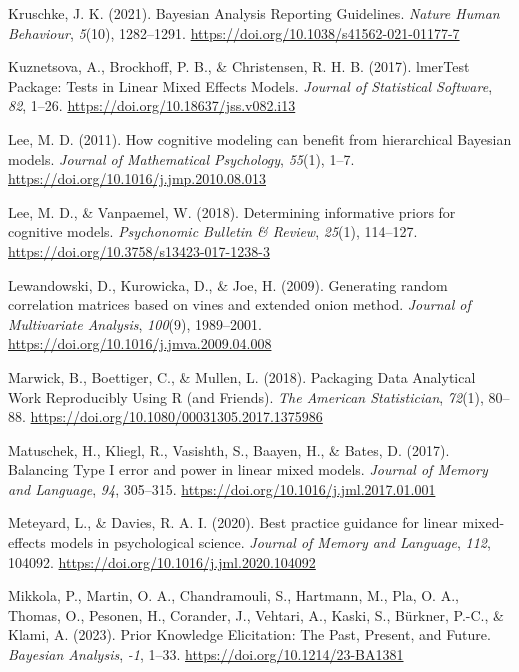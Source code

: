 \documentclass[
  doc,12pt,floatsintext]{apa7}
\newlength{\cslhangindent}
\newenvironment{CSLReferences}[2] %
 {\begin{list}{}{%
  \setlength{\itemindent}{0pt}
  \setlength{\leftmargin}{0pt}
  \setlength{\parsep}{0pt}
  \ifodd #1
   \setlength{\leftmargin}{\cslhangindent}
   \setlength{\itemindent}{-1\cslhangindent}
  \fi
  \setlength{\itemsep}{#2\baselineskip}}}
 {\end{list}}
\begin{document}
\begin{CSLReferences}{1}{0}
Kruschke, J. K. (2021). Bayesian {Analysis Reporting Guidelines}. \emph{Nature Human Behaviour}, \emph{5}(10), 1282--1291. \url{https://doi.org/10.1038/s41562-021-01177-7}

Kuznetsova, A., Brockhoff, P. B., \& Christensen, R. H. B. (2017). {lmerTest Package}: {Tests} in {Linear Mixed Effects Models}. \emph{Journal of Statistical Software}, \emph{82}, 1--26. \url{https://doi.org/10.18637/jss.v082.i13}

Lee, M. D. (2011). How cognitive modeling can benefit from hierarchical {Bayesian} models. \emph{Journal of Mathematical Psychology}, \emph{55}(1), 1--7. \url{https://doi.org/10.1016/j.jmp.2010.08.013}

Lee, M. D., \& Vanpaemel, W. (2018). Determining informative priors for cognitive models. \emph{Psychonomic Bulletin \& Review}, \emph{25}(1), 114--127. \url{https://doi.org/10.3758/s13423-017-1238-3}

Lewandowski, D., Kurowicka, D., \& Joe, H. (2009). Generating random correlation matrices based on vines and extended onion method. \emph{Journal of Multivariate Analysis}, \emph{100}(9), 1989--2001. \url{https://doi.org/10.1016/j.jmva.2009.04.008}

Marwick, B., Boettiger, C., \& Mullen, L. (2018). Packaging {Data Analytical Work Reproducibly Using R} (and {Friends}). \emph{The American Statistician}, \emph{72}(1), 80--88. \url{https://doi.org/10.1080/00031305.2017.1375986}

Matuschek, H., Kliegl, R., Vasishth, S., Baayen, H., \& Bates, D. (2017). Balancing {Type I} error and power in linear mixed models. \emph{Journal of Memory and Language}, \emph{94}, 305--315. \url{https://doi.org/10.1016/j.jml.2017.01.001}

Meteyard, L., \& Davies, R. A. I. (2020). Best practice guidance for linear mixed-effects models in psychological science. \emph{Journal of Memory and Language}, \emph{112}, 104092. \url{https://doi.org/10.1016/j.jml.2020.104092}

Mikkola, P., Martin, O. A., Chandramouli, S., Hartmann, M., Pla, O. A., Thomas, O., Pesonen, H., Corander, J., Vehtari, A., Kaski, S., Bürkner, P.-C., \& Klami, A. (2023). Prior {Knowledge Elicitation}: {The Past}, {Present}, and {Future}. \emph{Bayesian Analysis}, \emph{-1}, 1--33. \url{https://doi.org/10.1214/23-BA1381}


\end{CSLReferences}
\end{document}
